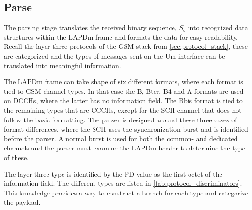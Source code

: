 \subsection{Parse}
The parsing stage translates the received binary sequence, $S_b$ into
recognized data structures within the \gls{LAPDm} frame and formats
the data for easy readability. Recall the layer three protocols of the
\gls{GSM} stack from \cref{sec:protocol_stack}, these are categorized
and the types of messages sent on the Um interface can be translated
into meaningful information.

The \gls{LAPDm} frame can take shape of six different formats, where
each format is tied to \gls{GSM} channel types. In that case the B,
Bter, B4 and A formats are used on \glspl{DCCH}, where the latter has
no information field. The Bbis format is tied to the remaining types
that are \glspl{CCCH}, except for the \gls{SCH} channel that does not
follow the basic formatting. The parser is designed around these three
cases of format differences, where the \gls{SCH} uses the
synchronization burst and is identified before the parser. A normal
burst is used for both the common- and dedicated channels and the
parser must examine the \gls{LAPDm} header to determine the type of
these.

The layer three type is identified by the \gls{PD} value as the
first octet of the information field. The different types are listed
in \cref{tab:protocol_discriminators}. This knowledge provides a way
to construct a branch for each type and categorize the payload.

